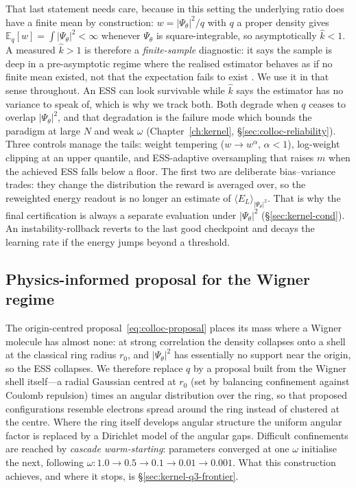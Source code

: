 That last statement needs care, because in this setting the underlying ratio does have a
finite mean by construction: $w=|\Psi_\theta|^2/q$ with $q$ a proper density gives
$\mathbb{E}_q[w]=\int|\Psi_\theta|^2<\infty$ whenever $\Psi_\theta$ is square-integrable, so
asymptotically $\hat k<1$. A measured $\hat k>1$ is therefore a \emph{finite-sample}
diagnostic: it says the sample is deep in a pre-asymptotic regime where the realised
estimator behaves as if no finite mean existed, not that the expectation fails to exist
\cite{Vehtari2024}. We use it in that sense throughout. An ESS can look survivable while $\hat k$ says the
estimator has no variance to speak of, which is why we track both. Both degrade when $q$
ceases to overlap $|\Psi_\theta|^2$, and that degradation is the failure mode which bounds
the paradigm at large $N$ and weak $\omega$ (Chapter~\ref{ch:kernel},
\S\ref{sec:colloc-reliability}). Three controls manage the tails: weight tempering ($w\!\to\!w^{\alpha}$, $\alpha<1$),
log-weight clipping at an upper quantile, and ESS-adaptive oversampling that raises $m$ when
the achieved ESS falls below a floor. The first two are deliberate bias--variance trades:
they change the distribution the reward is averaged over, so the reweighted energy readout is
no longer an estimate of $\langle E_L\rangle_{|\Psi_\theta|^2}$. That is why the final
certification is always a separate evaluation under $|\Psi_\theta|^2$
(\S\ref{sec:kernel-cond}). An instability-rollback reverts to the
last good checkpoint and decays the learning rate if the energy jumps beyond a threshold.

\subsection{Physics-informed proposal for the Wigner regime}
\label{subsec:colloc-wigner}
The origin-centred proposal~\eqref{eq:colloc-proposal} places its mass where a Wigner
molecule has almost none: at strong correlation the density collapses onto a shell at the
classical ring radius $r_0$, and $|\Psi_\theta|^2$ has essentially no support near the
origin, so the ESS collapses. We therefore replace $q$ by a proposal built from the Wigner
shell itself---a radial Gaussian centred at $r_0$ (set by balancing confinement against
Coulomb repulsion) times an angular distribution over the ring, so that proposed
configurations resemble electrons spread around the ring instead of clustered at the centre.
Where the ring itself develops angular structure the uniform angular factor is replaced by a
Dirichlet model of the angular gaps. Difficult confinements are reached by \emph{cascade
warm-starting}: parameters converged at one $\omega$ initialise the next, following
$\omega:1.0\!\to\!0.5\!\to\!0.1\!\to\!0.01\!\to\!0.001$. What this construction achieves,
and where it stops, is \S\ref{sec:kernel-q3-frontier}.

